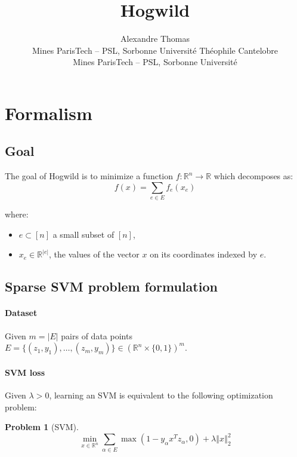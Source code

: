\documentclass[twoside,11pt]{article}
\newcommand{\norm}[1]{\left\Vert #1 \right\Vert}
\newcommand{\todo}[1]{\textbf{\color{red}{[TODO: #1]}}}
\newtheorem{problem}{Problem}
\begin{document}
\title{Hogwild} 
\author{%
\name Alexandre Thomas \\
\addr Mines ParisTech -- PSL, Sorbonne Université
\AND
\name Théophile Cantelobre\\
\addr Mines ParisTech -- PSL, Sorbonne Université
}

\maketitle


\todo{Convert to OCO course notation?}

\section{Formalism}
\subsection{Goal} The goal of Hogwild is to minimize a function $f: \mathbb R^n \rightarrow \mathbb R$ which decomposes as:
\begin{equation*}
    f(x) = \sum_{e\in E}f_e(x_e)
\end{equation*}

where:
\begin{itemize}
    \item $e\subset [n]$ a small subset of $[n]$,
    \item $x_e\in\mathbb R^{\vert e \vert}$, the values of the vector $x$ on its coordinates indexed by $e$.
\end{itemize}

\subsection{Sparse SVM problem formulation}
\paragraph{Dataset}
Given $m = \vert E \vert$ pairs of data points  $E = \lbrace (z_1, y_1), \ldots, (z_m, y_m)\rbrace\in \left(\mathbb R^n \times \lbrace 0, 1\rbrace\right)^m$.

\paragraph{SVM loss} Given $\lambda > 0$, learning an SVM is equivalent to the following optimization problem:
\begin{problem}[SVM]\label{prob:svm}
    \begin{equation*}
        \min_{x\in\mathbb R^n}\sum_{\alpha \in E}\max(1- y_\alpha x^Tz_\alpha, 0) + \lambda\norm{x}_2^2
    \end{equation*}
\end{problem}
\end{document}
